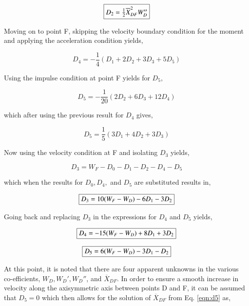 \begin{equation}
	\fbox{$
	D_2 = \frac{1}{2} \overline{X}_{DF}^2 W''_D
	$}
\label{eqn:d2}
\end{equation}

	Moving on to point F, skipping the velocity boundary condition for the moment
and applying the acceleration condition yields,

\begin{displaymath}
	D_4 = -\frac{1}{4}(D_1 + 2D_2 + 3D_3 + 5D_5)
\end{displaymath}

	Using the impulse condition at point F yields for $D_5$,

\begin{displaymath}
	D_5 = -\frac{1}{20}(2D_2 + 6D_3 + 12D_4)
\end{displaymath}

	which after using the previous result for $D_4$ gives,

\begin{displaymath}
	D_5 = \frac{1}{5}(3D_1 + 4D_2 + 3D_3)
\end{displaymath}

	Now using the velocity condition at F and isolating $D_3$ yields,

\begin{displaymath}
	D_3 = W_F - D_0 - D_1 - D_2 - D_4 - D_5	
\end{displaymath}	

	which when the results for $D_0, D_4,$ and $D_5$ are substituted 
results in,

\begin{equation}
	\fbox{$
	D_3 = 10(W_F - W_D) -6D_1 -3D_2
	$}
\label{eqn:d3}
\end{equation}

	Going back and replacing $D_3$ in the expressions for $D_4$ and $D_5$ 
yields,

\begin{equation}
	\fbox{$
	D_4 = -15(W_F - W_D) + 8D_1 + 3D_2
	$}
\label{eqn:d4}
\end{equation}

\begin{equation}
	\fbox{$
	D_5 = 6(W_F - W_D) - 3D_1  - D_2 
	$}
\label{eqn:d5}
\end{equation}

	At this point, it is noted that there are four apparent unknowns in the 
various co-efficients, $W_D, W_D', W_D''$, and $\overline{X}_{DF}$.  In order
to ensure a smooth increase in velocity along the axisymmetric axis between
points D and F, it can be assumed that $D_5 = 0$ which then allows for the
solution of $\overline{X}_{DF}$ from Eq. \ref{eqn:d5} as,


